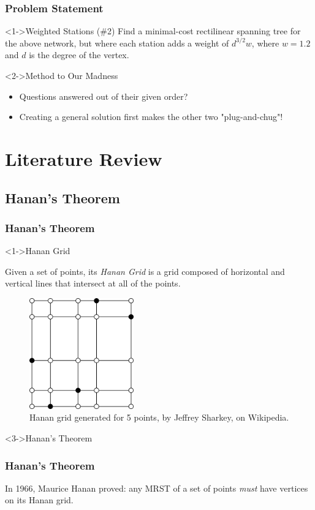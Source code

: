\documentclass{beamer}
\begin{document}
\begin{frame}
\frametitle{Problem Statement}
\begin{block}<1->{Weighted Stations}
(\#2) Find a minimal-cost rectilinear spanning tree for the above network, but where each station adds a
weight of \(d^{3/2}w\), where \(w = 1.2\) and \(d\) is the degree of the vertex.
\end{block}
\begin{block}<2->{Method to Our Madness}
\begin{itemize}
\item<2-> {Questions answered out of their given order?}
\item<3-> {Creating a general solution first makes the other two "plug-and-chug"!}
\end{itemize}
\end{block}
\end{frame}

\section{Literature Review}
\subsection{Hanan's Theorem}
\begin{frame}
\frametitle{Hanan's Theorem}
\begin{block}<1->{Hanan Grid}
\noindent\begin{minipage}{0.4\textwidth}
Given a set of points, its \emph{Hanan Grid} is a grid composed of horizontal and vertical lines that intersect at all of the points.
\end{minipage}
\hfill
\begin{minipage}{0.45\textwidth}
 \begin{figure}[Hp!]
	\includegraphics[width=0.4\textwidth]{HananGrid}
	\caption{Hanan grid generated for 5 points, by Jeffrey Sharkey, on Wikipedia.}
	\label{hanangrid_image}
\end{figure}
\end{minipage}
\end{block}
\begin{block}<3->{Hanan's Theorem}
\frametitle{Hanan's Theorem}
In 1966, Maurice Hanan proved: any MRST of a set of points \emph{must} have vertices on its Hanan grid.
\end{block}
\end{frame}
\end{document}
